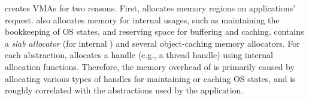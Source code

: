 


\thelibos{} creates VMAs for two reasons.
First, \thelibos{} allocates memory regions on applications' request.
\thelibos{} also allocates memory for internal usages,
such as maintaining
the bookkeeping of OS states,
and reserving space for buffering and caching.
\thelibos{} contains a {\em slab allocator} (for internal ) and several object-caching memory allocators.
For each abstraction, \thelibos{} allocates a handle (e.g., a thread handle)
using internal allocation functions.
Therefore, the memory overhead of \thelibos{} %
is primarily caused by allocating various types of handles for maintaining or caching OS states,
and is roughly correlated with
the abstractions used by the application. 






